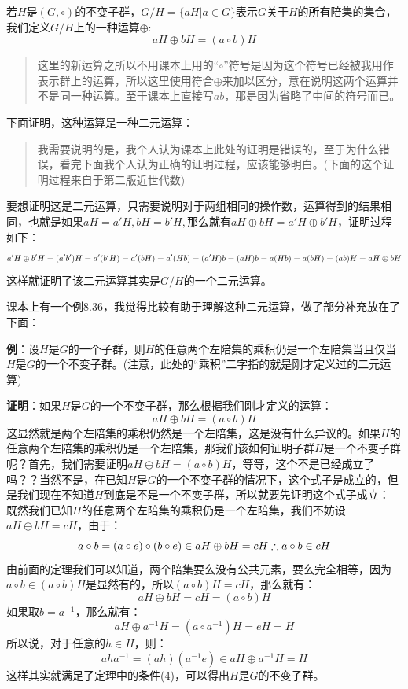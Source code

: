 \documentclass[12pt, a4paper, oneside]{ctexart}
\newenvironment{myquote}{\begin{quote}\small\color{gray}}{\end{quote}}
\begin{document}
若$H$是$(G,\circ)$的不变子群，$G/H=\{aH|a\in G\}$表示$G$关于$H$的所有陪集的集合，我们定义$G/H$上的一种运算$\oplus$:
\[
aH\oplus bH=(a\circ b)H
\]

\begin{myquote}
这里的新运算之所以不用课本上用的“$\circ$”符号是因为这个符号已经被我用作表示群上的运算，所以这里使用符合$\oplus$来加以区分，意在说明这两个运算并不是同一种运算。至于课本上直接写$ab$，那是因为省略了中间的符号而已。
\end{myquote}

下面证明，这种运算是一种二元运算：

\begin{myquote}
我需要说明的是，我个人认为课本上此处的证明是错误的，至于为什么错误，看完下面我个人认为正确的证明过程，应该能够明白。(下面的这个证明过程来自于第二版近世代数)
\end{myquote}

要想证明这是二元运算，只需要说明对于两组相同的操作数，运算得到的结果相同，也就是如果$aH=a'H,bH=b'H,那么就有aH\oplus bH=a'H\oplus b'H$，证明过程如下：
\[
a'H\oplus b'H=(a'b')H=a'(b'H)=a'(bH)=a'(Hb)\\
=(a'H)b=(aH)b=a(Hb)=a(bH)=(ab)H\\
=aH\oplus bH
\]
这样就证明了该二元运算其实是$G/H$的一个二元运算。

课本上有一个例8.36，我觉得比较有助于理解这种二元运算，做了部分补充放在了下面：

\textbf{例}：设$H$是$G$的一个子群，则$H$的任意两个左陪集的乘积仍是一个左陪集当且仅当$H$是$G$的一个不变子群。(注意，此处的“乘积”二字指的就是刚才定义过的二元运算)

\textbf{证明}：如果$H$是$G$的一个不变子群，那么根据我们刚才定义的运算：
\[
aH\oplus bH=(a\circ b)H
\]
这显然就是两个左陪集的乘积仍然是一个左陪集，这是没有什么异议的。如果$H$的任意两个左陪集的乘积仍是一个左陪集，那我们该如何证明子群$H$是一个不变子群呢？首先，我们需要证明$aH\oplus bH=(a\circ b)H$，等等，这个不是已经成立了吗？？当然不是，在已知$H$是$G$的一个不变子群的情况下，这个式子是成立的，但是我们现在不知道$H$到底是不是一个不变子群，所以就要先证明这个式子成立：
既然我们已知$H$的任意两个左陪集的乘积仍是一个左陪集，我们不妨设$aH\oplus bH=cH$，由于：
\[
a\circ b=(a\circ e)\circ (b\circ e)\in aH\oplus bH=cH\\
\therefore a\circ b\in cH
\]
由前面的定理我们可以知道，两个陪集要么没有公共元素，要么完全相等，因为$a\circ b\in (a\circ b)H$是显然有的，所以$(a\circ b)H=cH$，那么就有：
\[
aH\oplus bH=cH=(a\circ b)H
\]
如果取$b=a^{-1}$，那么就有：
\[
aH\oplus a^{-1}H=(a\circ a^{-1})H=eH=H
\]
所以说，对于任意的$h\in H$，则：
\[
aha^{-1}=(ah)(a^{-1}e)\in aH\oplus a^{-1}H=H
\]
这样其实就满足了定理中的条件(4)，可以得出$H$是$G$的不变子群。
\end{document}
